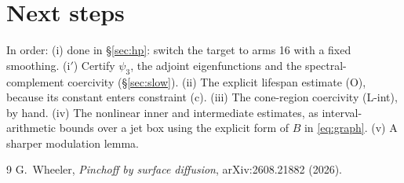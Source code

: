 \documentclass[11pt]{amsart}
\theoremstyle{remark}
\begin{document}
\section{Next steps}
In order: (i) done in \S\ref{sec:hp}: switch the target to arms 16 with a fixed smoothing. (i$'$) Certify $\psi_3$, the adjoint eigenfunctions and the spectral-complement coercivity (\S\ref{sec:slow}). (ii) The explicit lifespan estimate (O), because its constant enters constraint (c). (iii) The cone-region coercivity (L-int), by hand. (iv) The nonlinear inner and intermediate estimates, as interval-arithmetic bounds over a jet box using the explicit form of $B$ in \eqref{eq:graph}. (v) A sharper modulation lemma.

\begin{thebibliography}{9}
 G.~Wheeler, \emph{Pinchoff by surface diffusion}, arXiv:2608.21882 (2026).
\end{thebibliography}
\end{document}
